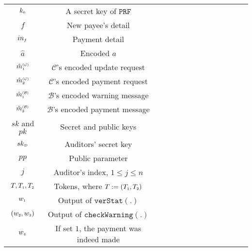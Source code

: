 \begin{table*}[!htb]
\begin{scriptsize}
\begin{center}
{{\begin{tabular}{|c|c|c|c|c|c|c|c|c|c|c|c|c|c|}
\cellcolor{gray!20}\scriptsize$ k_{\scriptscriptstyle 0}$ &\cellcolor{gray!20}\scriptsize   A secret key of $\mathtt{PRF}$\\ 
%               
\cellcolor{white!20}\scriptsize$f$ &\cellcolor{white!20}\scriptsize New payee’s detail  \\ 
\cellcolor{gray!20}\scriptsize$in_{\scriptscriptstyle f}$ &\cellcolor{gray!20}\scriptsize Payment detail \\ 
%
  \cellcolor{white!20}\scriptsize$\hat a$ &\cellcolor{white!20}\scriptsize Encoded $a$ \\     
%
\cellcolor{gray!20}\scriptsize$\hat {m}^{\scriptscriptstyle(\mathcal{C})}_{\scriptscriptstyle 1}$ &\cellcolor{gray!20}\scriptsize $\mathcal{C}$'s encoded update request\\     
%
\cellcolor{white!20}\scriptsize$\hat {m}^{\scriptscriptstyle(\mathcal{C})}_{\scriptscriptstyle 2}$ &\cellcolor{white!20}\scriptsize $\mathcal{C}$'s encoded payment request\\     
%      
\cellcolor{gray!20}\scriptsize$\hat {m}^{\scriptscriptstyle(\mathcal{B})}_{\scriptscriptstyle 1}$ &\cellcolor{gray!20}\scriptsize $\mathcal{B}$'s encoded warning message\\     
%
\cellcolor{white!20}\scriptsize$\hat {m}^{\scriptscriptstyle(\mathcal{B})}_{\scriptscriptstyle 2}$ &\cellcolor{white!20}\scriptsize $\mathcal{B}$'s encoded payment message\\     
%          
     \cellcolor{gray!20}\scriptsize$sk$ and $pk$ &\cellcolor{gray!20}\scriptsize Secret  and public keys\\     
%
   \cellcolor{white!20}\scriptsize$sk_{\scriptscriptstyle\mathcal{D}}$ &\cellcolor{white!20}\scriptsize Auditors' secret key\\     
%    
\cellcolor{gray!20}\scriptsize$pp$ &\cellcolor{gray!20}\scriptsize Public parameter\\  
%
\cellcolor{white!20}\scriptsize$j$ &\cellcolor{white!20}\scriptsize  Auditor's index,  $1\leq j\leq n$ \\ 
%
\cellcolor{gray!20}\scriptsize$T, T_{\scriptscriptstyle 1},T_{\scriptscriptstyle 2}$ &\cellcolor{gray!20}\scriptsize  Tokens, where  $T:=( T_{\scriptscriptstyle 1},T_{\scriptscriptstyle 2})$\\ 
%
\cellcolor{white!20}\scriptsize$w_{\scriptscriptstyle 1}$ &\cellcolor{white!20}\scriptsize  Output of $\mathtt{verStat}(.)$\\ 
%
\cellcolor{gray!20}\scriptsize$(w_{\scriptscriptstyle 2},w_{\scriptscriptstyle 3})$ &\cellcolor{gray!20}\scriptsize  Output of $\mathtt{checkWarning}(.)$\\ 
%
\cellcolor{white!20}\scriptsize$w_{\scriptscriptstyle 4}$ &\cellcolor{white!20}\scriptsize  If set $1$, the payment was indeed made\\ 

\end{tabular}}}
\end{center}
\end{scriptsize}
\end{table*}

